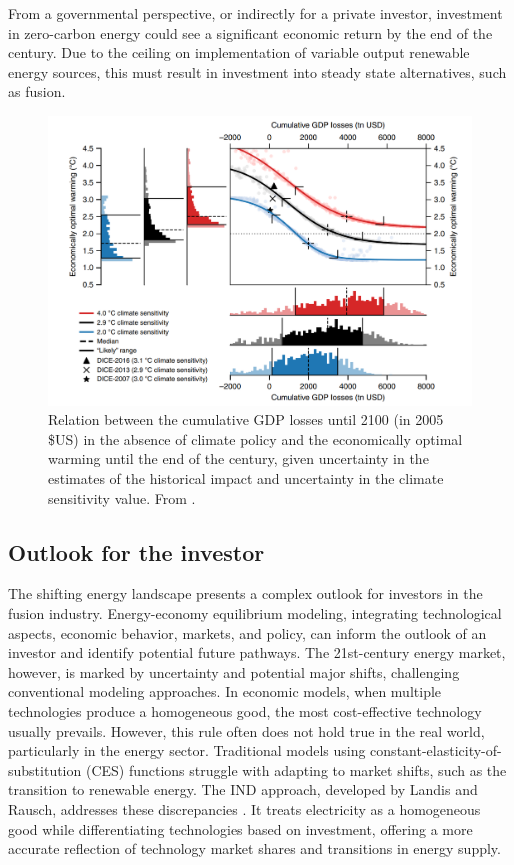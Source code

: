 From a governmental perspective, or indirectly for a private investor, investment in zero-carbon energy could see a significant economic return by the end of the century. Due to the ceiling on implementation of variable output renewable energy sources, this must result in investment into steady state alternatives, such as fusion.

\begin{figure}[h!]
    \centering
    \includegraphics[width =0.65\linewidth]{SubreportFigures/climate_gdp.pdf}
    \caption{Relation between the cumulative GDP losses until 2100 (in 2005 \$US) in the absence of climate policy and the economically optimal warming until the end of the century, given uncertainty in the estimates of the historical impact and uncertainty in the climate sensitivity value. From \cite{glanemann2020paris}. }
    \label{fig:climate_gdp}
\end{figure}




\subsection{Outlook for the investor}

The shifting energy landscape presents a complex outlook for investors in the fusion industry. Energy-economy equilibrium modeling, integrating technological aspects, economic behavior, markets, and policy, can inform the outlook of an investor and identify potential future pathways. The 21st-century energy market, however, is marked by uncertainty and potential major shifts, challenging conventional modeling approaches. In economic models, when multiple technologies produce a homogeneous good, the most cost-effective technology usually prevails. However, this rule often does not hold true in the real world, particularly in the energy sector. Traditional models using constant-elasticity-of-substitution (CES) functions struggle with adapting to market shifts, such as the transition to renewable energy. The IND approach, developed by Landis and Rausch, addresses these discrepancies \cite{landis2017deep}. It treats electricity as a homogeneous good while differentiating technologies based on investment, offering a more accurate reflection of technology market shares and transitions in energy supply. 

